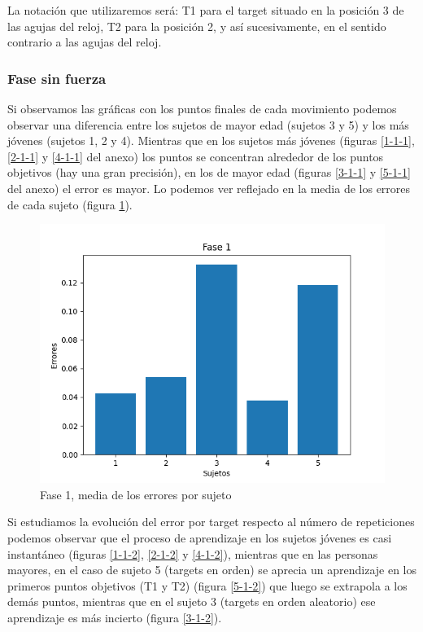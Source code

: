 \documentclass[a4paper,11pt, oneside]{book}
\begin{document}
La notación que utilizaremos será: T1 para el target situado en la posición 3 de las agujas del reloj, T2 para la posición 2, y así sucesivamente, en el sentido contrario a las agujas del reloj.

\subsubsection{Fase sin fuerza}
Si observamos las gráficas con los puntos finales de cada movimiento podemos observar una diferencia entre los sujetos de mayor edad (sujetos 3 y 5) y los más jóvenes (sujetos 1, 2 y 4). Mientras que en los sujetos más jóvenes (figuras \ref{1-1-1}, \ref{2-1-1} y \ref{4-1-1} del anexo) los puntos se concentran alrededor de los puntos objetivos (hay una gran precisión), en los de mayor edad (figuras \ref{3-1-1} y \ref{5-1-1} del anexo) el error es mayor. Lo podemos ver reflejado en la media de los errores de cada sujeto (figura \ref{fase1-errores}).



\begin{figure}[H]
	\centering
	\includegraphics[width=\linewidth]{fase1-errores}
	\caption{Fase 1, media de los errores por sujeto}
	\label{fase1-errores}
\end{figure}

Si estudiamos la evolución del error por target respecto al número de repeticiones podemos observar que el proceso de aprendizaje en los sujetos jóvenes es casi instantáneo (figuras \ref{1-1-2}, \ref{2-1-2} y \ref{4-1-2}), mientras que en las personas mayores, en el caso de sujeto 5 (targets en orden) se aprecia un aprendizaje en los primeros puntos objetivos (T1 y T2) (figura \ref{5-1-2}) que luego se extrapola a los demás puntos, mientras que en el sujeto 3 (targets en orden aleatorio) ese aprendizaje es más incierto (figura \ref{3-1-2}).
\end{document}

